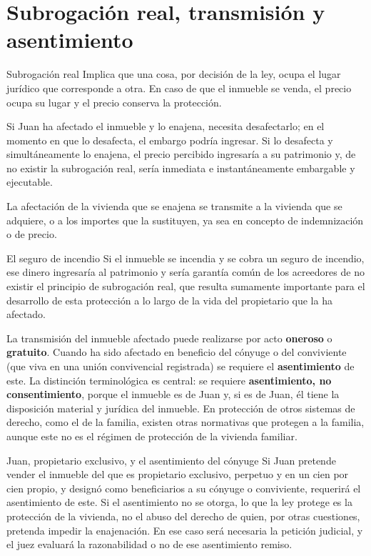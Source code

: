 \documentclass[12pt,oneside]{book}
\begin{document}
\section{Subrogación real, transmisión y asentimiento}

\begin{definicion}{Subrogación real}
Implica que una cosa, por decisión de la ley, ocupa el lugar jurídico que corresponde a otra. En caso de que el inmueble se venda, el precio ocupa su lugar y el precio conserva la protección.
\end{definicion}

Si Juan ha afectado el inmueble y lo enajena, necesita desafectarlo; en el momento en que lo desafecta, el embargo podría ingresar. Si lo desafecta y simultáneamente lo enajena, el precio percibido ingresaría a su patrimonio y, de no existir la subrogación real, sería inmediata e instantáneamente embargable y ejecutable.

\begin{importante}
La afectación de la vivienda que se enajena se transmite a la vivienda que se adquiere, o a los importes que la sustituyen, ya sea en concepto de indemnización o de precio.
\end{importante}

\begin{ejemplo}{El seguro de incendio}
Si el inmueble se incendia y se cobra un seguro de incendio, ese dinero ingresaría al patrimonio y sería garantía común de los acreedores de no existir el principio de subrogación real, que resulta sumamente importante para el desarrollo de esta protección a lo largo de la vida del propietario que la ha afectado.
\end{ejemplo}

La transmisión del inmueble afectado puede realizarse por acto \textbf{oneroso} o \textbf{gratuito}. Cuando ha sido afectado en beneficio del cónyuge o del conviviente (que viva en una unión convivencial registrada) se requiere el \textbf{asentimiento} de este. La distinción terminológica es central: se requiere \textbf{asentimiento, no consentimiento}, porque el inmueble es de Juan y, si es de Juan, él tiene la disposición material y jurídica del inmueble. En protección de otros sistemas de derecho, como el de la familia, existen otras normativas que protegen a la familia, aunque este no es el régimen de protección de la vivienda familiar.

\begin{ejemplo}{Juan, propietario exclusivo, y el asentimiento del cónyuge}
Si Juan pretende vender el inmueble del que es propietario exclusivo, perpetuo y en un cien por cien propio, y designó como beneficiarios a su cónyuge o conviviente, requerirá el asentimiento de este. Si el asentimiento no se otorga, lo que la ley protege es la protección de la vivienda, no el abuso del derecho de quien, por otras cuestiones, pretenda impedir la enajenación. En ese caso será necesaria la petición judicial, y el juez evaluará la razonabilidad o no de ese asentimiento remiso.
\end{ejemplo}
\end{document}
